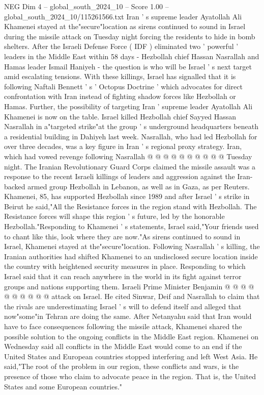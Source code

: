 \begin{textsample}{NEG Dim 4 – global\_south\_2024\_10 – Score 1.00 – global\_south\_2024\_10/115261566.txt}  \label{ex:f4_neg_074}
Iran ' s supreme leader Ayatollah Ali Khamenei stayed at the"secure"location as sirens continued to sound in Israel during the missile attack on Tuesday night forcing the residents to hide in bomb shelters.
After the Israeli Defense Force ( IDF ) eliminated two ' powerful ' leaders in the Middle East within 58 days - Hezbollah chief Hassan Nasrallah and Hamas leader Ismail Haniyeh - the question is who will be Israel ' s next target amid escalating tensions.
With these killings, Israel has signalled that it is following Naftali Bennett ' s ' Octopus Doctrine ' which advocates for direct confrontation with Iran instead of fighting shadow forces like Hezbollah or Hamas.
Further, the possibility of targeting Iran ' supreme leader Ayatollah Ali Khamenei is now on the table.
Israel killed Hezbollah chief Sayyed Hassan Nasrallah in a"targeted strike"at the group ' s underground headquarters beneath a residential building in Dahiyeh last week.
Nasrallah, who had led Hezbollah for over three decades, was a key figure in Iran ' s regional proxy strategy.
Iran, which had vowed revenge following Nasrallah @ @ @ @ @ @ @ @ @ @ Tuesday night.
The Iranian Revolutionary Guard Corps claimed the missile assault was a response to the recent Israeli killings of leaders and aggression against the Iran-backed armed group Hezbollah in Lebanon, as well as in Gaza, as per Reuters.
Khamenei, 85, has supported Hezbollah since 1989 and after Israel ' s strike in Beirut he said,"All the Resistance forces in the region stand with Hezbollah.
The Resistance forces will shape this region ' s future, led by the honorable Hezbollah."Responding to Khamenei ' s statements, Israel said,"Your friends used to chant like this, look where they are now."As sirens continued to sound in Israel, Khamenei stayed at the"secure"location.
Following Nasrallah ' s killing, the Iranian authorities had shifted Khamenei to an undisclosed secure location inside the country with heightened security measures in place.
Responding to which Israel said that it can reach anywhere in the world in its fight against terror groups and nations supporting them.
Israeli Prime Minister Benjamin @ @ @ @ @ @ @ @ @ @ attack on Israel.
He cited Sinwar, Deif and Nasrallah to claim that the rivals are underestimating Israel ' s will to defend itself and alleged that now"some"in Tehran are doing the same.
After Netanyahu said that Iran would have to face consequences following the missile attack, Khamenei shared the possible solution to the ongoing conflicts in the Middle East region.
Khamenei on Wednesday said all conflicts in the Middle East would come to an end if the United States and European countries stopped interfering and left West Asia.
He said,"The root of the problem in our region, these conflicts and wars, is the presence of those who claim to advocate peace in the region.
That is, the United States and some European countries."

\end{textsample}
